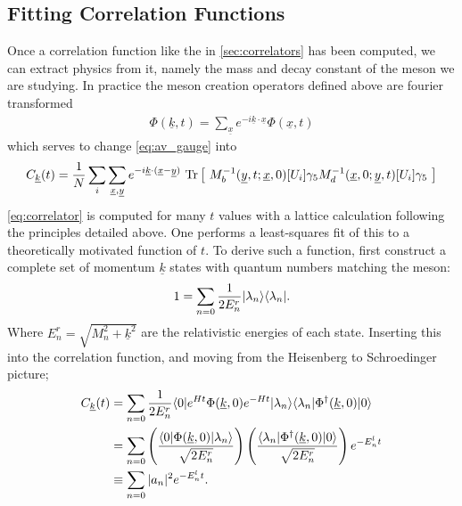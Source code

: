 \documentclass[a4paper,10pt]{article}
\numberwithin{equation}{section}
\begin{document}
\subsection{Fitting Correlation Functions}
\label{sec:fitting}

Once a correlation function like the in \ref{sec:correlators} has been computed, we can extract physics from it, namely the mass and decay constant of the meson we are studying. In practice the meson creation operators defined above are fourier transformed
\begin{align}
	\Phi(\underline{k},t) = \sum_{\underline{x}} e^{-i\underline{k}\cdot\underline{x}} \Phi(\underline{x},t)
\end{align}
which serves to change \eqref{eq:av_gauge} into 
\begin{align}
	C_{\underline{k}}(t) = {1\over N} \sum_i \sum_{\underline{x},\underline{y}} e^{-i\underline{k}\cdot(\underline{x}-\underline{y})} \text{ Tr}\left[\text{ } M^{-1}_b(\underline{y},t;\underline{x},0)[U_i] \gamma_5 M^{-1}_d(\underline{x},0;\underline{y},t)[U_i] \gamma_5 \text{ }\right]
	\label{eq:correlator}
\end{align}
\eqref{eq:correlator} is computed for many $t$ values with a lattice calculation following the principles detailed above. One performs a least-squares fit of 
this to a theoretically motivated function of $t$. To derive such a function,
first construct a complete set of momentum $\underline{k}$ states with quantum numbers matching the meson:
\begin{align}
 1 = \sum_{n=0} {1\over 2E^r_n} | \lambda_n \rangle \langle \lambda_n |.
\end{align}
Where $E^r_n = \sqrt{ M_n^2 + \underline{k}^2}$ are the relativistic energies of each state. Inserting this into the correlation function, and moving from the Heisenberg to Schroedinger picture;
\begin{align}
	C_{\underline{k}}(t) &= \sum_{n=0} {1\over 2E^r_n} \langle 0 | e^{Ht} \Phi(\underline{k},0) e^{-Ht} | \lambda_n \rangle \langle \lambda_n | \Phi^{\dagger}(\underline{k},0) | 0 \rangle
	\nonumber
	\\ &= \sum_{n=0}  \left( {\langle 0 | \Phi(\underline{k},0) | \lambda_n \rangle \over \sqrt{2E^r_n}} \right) \left( {\langle \lambda_n | \Phi^{\dagger}(\underline{k},0) | 0 \rangle \over \sqrt{2E^r_n} } \right) e^{-E^l_n t}
	\nonumber
	\\ & \equiv \sum_{n=0} |a_n|^2 e^{-E^l_n t}.
	\label{eq:multiexponential}
\end{align}
\end{document}
